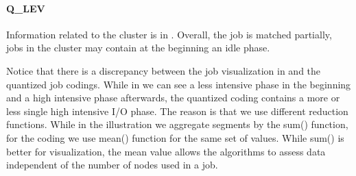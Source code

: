 \documentclass{jhps}
\begin{document}
\FloatBarrier
\paragraph{Q\_LEV}
Information related to the cluster is in .
Overall, the job is matched partially, jobs in the cluster may contain at the beginning an idle phase.

Notice that there is a discrepancy between the job visualization in  and the quantized job codings.
While in  we can see a less intensive phase in the beginning and a high intensive phase afterwards, the quantized coding contains a more or less single high intensive I/O phase.
The reason is that we use different reduction functions.
While in the illustration we aggregate segments by the sum() function, for the coding we use mean() function for the same set of values.
While sum() is better for visualization, the mean value allows the algorithms to assess data independent of the number of nodes used in a job.
\end{document}
